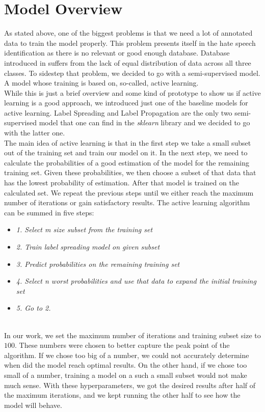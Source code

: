 \documentclass[10pt, a4paper]{article}
\begin{document}
	\section{Model Overview}
	As stated above, one of the biggest problems is that we need a lot of annotated data to train the model properly. This problem presents itself in the hate speech identification as there is no relevant or good enough database. Database introduced in \citet{Davidson2017AutomatedHS} suffers from the lack of equal distribution of data across all three classes. To sidestep that problem, we decided to go with a semi-supervised model. A model whose training is based on, so-called, active learning.
	\\While this is just a brief overview and some kind of prototype to show us if active learning is a good approach, we introduced just one of the baseline models for active learning. Label Spreading and Label Propagation are the only two semi-supervised model that one can find in the \textit{sklearn} library \citep{scikit-learn} and we decided to go with the latter one.
	\\The main idea of active learning is that in the first step we take a small subset out of the training set and train our model on it. In the next step, we need to calculate the  probabilities of a good estimation of the model for the remaining training set. Given these probabilities, we then choose a subset of that data that has the lowest probability of estimation. After that model is trained on the calculated set. We repeat the previous steps until we either reach the maximum number of iterations or gain satisfactory results.
	The active learning algorithm can be summed in five steps:
	\begin{itemize}
		\item \textit{1. Select m size subset from the training set}
		\item \textit{2. Train label spreading model on given subset}
		\item \textit{3. Predict probabilities on the remaining training set}
		\item \textit{4. Select n worst probabilities and  use that data to expand the initial training set}
		\item \textit{5. Go to 2.}
	\end{itemize}
	\\In our work, we set the maximum number of iterations and training subset size to $100$. These numbers were chosen to better capture the peak point of the algorithm. If we chose too big of a number, we could not accurately determine when did the model reach optimal results. On the other hand, if we chose too small of a number, training a model on a such a small subset would not make much sense. With these hyperparameters, we got the desired results after half of the maximum iterations, and we kept running the other half to see how the model will behave.
	
\end{document}
